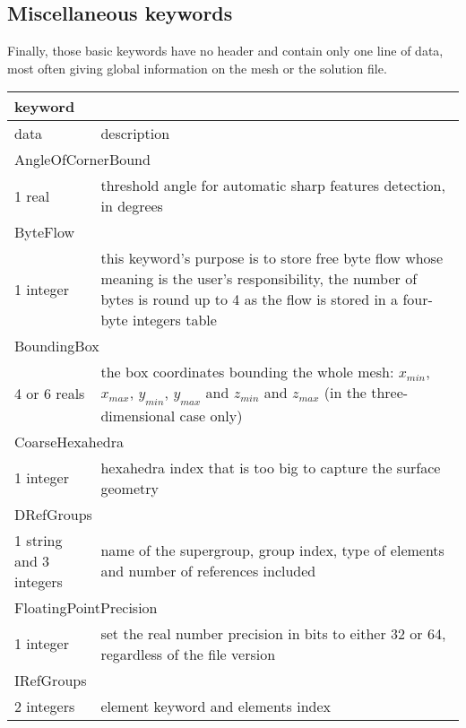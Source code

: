 \documentclass[a4paper,12pt]{article}
\begin{document}
\subsection{Miscellaneous keywords}

Finally, those basic keywords have no header and contain only one line of data, most often giving global information on the mesh or the solution file.

\begin{tabular}{|m{4cm}|m{11cm}|}

\hline
\multicolumn{2}{|l|}{keyword} \\
\hline
data & description \\
\hline\hline

\multicolumn{2}{|l|}{AngleOfCornerBound} \\
\hline
1 real & threshold angle for automatic sharp features detection, in degrees\\
\hline\hline

\multicolumn{2}{|l|}{ByteFlow} \\
\hline
1 integer & this keyword's purpose is to store free byte flow whose meaning is the user's responsibility, the number of bytes is round up to 4 as the flow is stored in a four-byte integers table \\
\hline\hline

\multicolumn{2}{|l|}{BoundingBox} \\
\hline
4 or 6 reals & the box coordinates bounding the whole mesh: $x_{min}$, $x_{max}$, $y_{min}$, $y_{max}$ and $z_{min}$ and $z_{max}$ (in the three-dimensional case only) \\
\hline\hline

\multicolumn{2}{|l|}{CoarseHexahedra} \\
\hline
1 integer & hexahedra index that is too big to capture the surface geometry \\
\hline\hline

\multicolumn{2}{|l|}{DRefGroups} \\
\hline
1 string and 3 integers & name of the supergroup, group index, type of elements and number of references included \\
\hline\hline

\multicolumn{2}{|l|}{FloatingPointPrecision} \\
\hline
1 integer & set the real number precision in bits to either 32 or 64, regardless of the file version \\
\hline\hline

\multicolumn{2}{|l|}{IRefGroups} \\
\hline
2 integers & element keyword and elements index \\
\hline\hline


\end{tabular}
\end{document}
